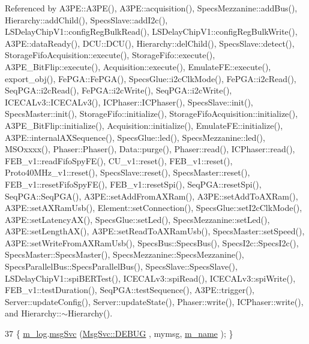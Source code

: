 Referenced by A3\+P\+E\+::\+A3\+P\+E(), A3\+P\+E\+::acquisition(), Specs\+Mezzanine\+::add\+Bus(), Hierarchy\+::add\+Child(), Specs\+Slave\+::add\+I2c(), L\+S\+Delay\+Chip\+V1\+::config\+Reg\+Bulk\+Read(), L\+S\+Delay\+Chip\+V1\+::config\+Reg\+Bulk\+Write(), A3\+P\+E\+::data\+Ready(), D\+C\+U\+::\+D\+C\+U(), Hierarchy\+::del\+Child(), Specs\+Slave\+::detect(), Storage\+Fifo\+Acquisition\+::execute(), Storage\+Fifo\+::execute(), A3\+P\+E\+\_\+\+Bit\+Flip\+::execute(), Acquisition\+::execute(), Emulate\+F\+E\+::execute(), export\+\_\+obj(), Fe\+P\+G\+A\+::\+Fe\+P\+G\+A(), Specs\+Glue\+::i2c\+Clk\+Mode(), Fe\+P\+G\+A\+::i2c\+Read(), Seq\+P\+G\+A\+::i2c\+Read(), Fe\+P\+G\+A\+::i2c\+Write(), Seq\+P\+G\+A\+::i2c\+Write(), I\+C\+E\+C\+A\+Lv3\+::\+I\+C\+E\+C\+A\+Lv3(), I\+C\+Phaser\+::\+I\+C\+Phaser(), Specs\+Slave\+::init(), Specs\+Master\+::init(), Storage\+Fifo\+::initialize(), Storage\+Fifo\+Acquisition\+::initialize(), A3\+P\+E\+\_\+\+Bit\+Flip\+::initialize(), Acquisition\+::initialize(), Emulate\+F\+E\+::initialize(), A3\+P\+E\+::internal\+A\+X\+Sequence(), Specs\+Glue\+::led(), Specs\+Mezzanine\+::led(), M\+S\+Oxxxx(), Phaser\+::\+Phaser(), Data\+::purge(), Phaser\+::read(), I\+C\+Phaser\+::read(), F\+E\+B\+\_\+v1\+::read\+Fifo\+Spy\+F\+E(), C\+U\+\_\+v1\+::reset(), F\+E\+B\+\_\+v1\+::reset(), Proto40\+M\+Hz\+\_\+v1\+::reset(), Specs\+Slave\+::reset(), Specs\+Master\+::reset(), F\+E\+B\+\_\+v1\+::reset\+Fifo\+Spy\+F\+E(), F\+E\+B\+\_\+v1\+::reset\+Spi(), Seq\+P\+G\+A\+::reset\+Spi(), Seq\+P\+G\+A\+::\+Seq\+P\+G\+A(), A3\+P\+E\+::set\+Add\+From\+A\+X\+Ram(), A3\+P\+E\+::set\+Add\+To\+A\+X\+Ram(), A3\+P\+E\+::set\+A\+X\+Ram\+Usb(), Element\+::set\+Connection(), Specs\+Glue\+::set\+I2c\+Clk\+Mode(), A3\+P\+E\+::set\+Latency\+A\+X(), Specs\+Glue\+::set\+Led(), Specs\+Mezzanine\+::set\+Led(), A3\+P\+E\+::set\+Length\+A\+X(), A3\+P\+E\+::set\+Read\+To\+A\+X\+Ram\+Usb(), Specs\+Master\+::set\+Speed(), A3\+P\+E\+::set\+Write\+From\+A\+X\+Ram\+Usb(), Specs\+Bus\+::\+Specs\+Bus(), Specs\+I2c\+::\+Specs\+I2c(), Specs\+Master\+::\+Specs\+Master(), Specs\+Mezzanine\+::\+Specs\+Mezzanine(), Specs\+Parallel\+Bus\+::\+Specs\+Parallel\+Bus(), Specs\+Slave\+::\+Specs\+Slave(), L\+S\+Delay\+Chip\+V1\+::spi\+B\+E\+R\+Test(), I\+C\+E\+C\+A\+Lv3\+::spi\+Read(), I\+C\+E\+C\+A\+Lv3\+::spi\+Write(), F\+E\+B\+\_\+v1\+::test\+Duration(), Seq\+P\+G\+A\+::test\+Sequence(), A3\+P\+E\+::trigger(), Server\+::update\+Config(), Server\+::update\+State(), Phaser\+::write(), I\+C\+Phaser\+::write(), and Hierarchy\+::$\sim$\+Hierarchy().


\begin{DoxyCode}
37 \{ \hyperlink{classObject_a0d269813dd7ac1f24bc143031e2963f2}{m\_log}.\hyperlink{classMsgSvc_ad25f18047920cc59a314e5098259711c}{msgSvc} (\hyperlink{classMsgSvc_ae671eb7301996cd049d2da8a65925926a1dbdcc82dce88370ec335883c83b38b0}{MsgSvc::DEBUG}   , mymsg, \hyperlink{classObject_a8b83c95c705d2c3ba0d081fe1710f48d}{m\_name} ); \}
\end{DoxyCode}
\mbox{\label{classObject_a6c9a0397ca804e04d675ed05683f5420}} 
